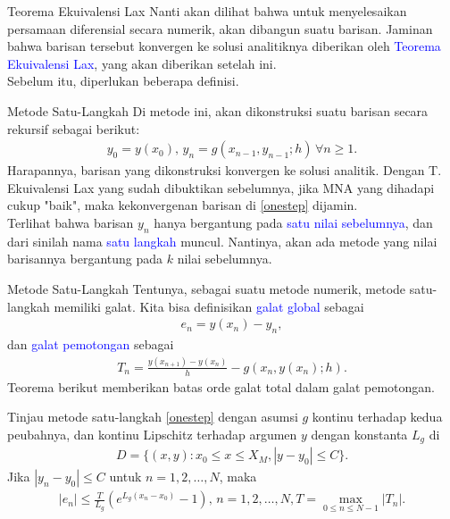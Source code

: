 \documentclass[xcolor={dvipsnames}, 9pt]{beamer}
\renewcommand{\emph}[1]{\textcolor{Blue}{#1}}
\begin{document}
    \begin{frame}{Teorema Ekuivalensi Lax}
        Nanti akan dilihat bahwa untuk menyelesaikan persamaan diferensial secara numerik, akan dibangun suatu barisan. Jaminan bahwa barisan tersebut konvergen ke solusi analitiknya diberikan oleh \emph{Teorema Ekuivalensi Lax}, yang akan diberikan setelah ini. \\
        Sebelum itu, diperlukan beberapa definisi. 
    \end{frame}
    \begin{frame}{Metode Satu-Langkah}
        Di metode ini, akan dikonstruksi suatu barisan secara rekursif sebagai berikut:
        \begin{align}\label{onestep}
            y_0 = y(x_0),\, y_n = g(x_{n-1}, y_{n-1}; h) \, \forall n\geq 1.
        \end{align}
        Harapannya, barisan yang dikonstruksi konvergen ke solusi analitik. Dengan T. Ekuivalensi Lax yang sudah dibuktikan sebelumnya, jika MNA yang dihadapi cukup "baik", maka kekonvergenan barisan di \eqref{onestep} dijamin. \\
        Terlihat bahwa barisan $y_n$ hanya bergantung pada \emph{satu nilai sebelumnya}, dan dari sinilah nama \emph{satu langkah} muncul. Nantinya, akan ada metode yang nilai barisannya bergantung pada $k$ nilai sebelumnya.
    \end{frame}
    \begin{frame}{Metode Satu-Langkah}
        Tentunya, sebagai suatu metode numerik, metode satu-langkah memiliki galat. Kita bisa definisikan \emph{galat global} sebagai 
        \begin{align*}
            e_n = y(x_n) - y_n,
        \end{align*}dan \emph{galat pemotongan} sebagai
        \begin{align*}
            T_n = \frac{y(x_{n+1})-y(x_n)}{h} - g(x_n,y(x_n);h).
        \end{align*}
        Teorema berikut memberikan batas orde galat total dalam galat pemotongan.
        \begin{theorem}
            Tinjau metode satu-langkah \eqref{onestep} dengan asumsi $g$ kontinu terhadap kedua peubahnya, dan kontinu Lipschitz terhadap argumen $y$ dengan konstanta $L_g$ di
            \begin{align*}
                D = \{(x,y) : x_0\leq x\leq X_M, |y-y_0|\leq C\}.
            \end{align*}
            Jika $|y_n-y_0|\leq C$ untuk $n=1,2,\dots, N$, maka
            \begin{align*}
                |e_n| \leq \frac{T}{L_g}\left(e^{L_g(x_n-x_0)}-1\right), \, n=1,2,\dots,N, T = \max_{0\leq n\leq N-1}|T_n|.
            \end{align*}
        \end{theorem}
    \end{frame}
\end{document}
